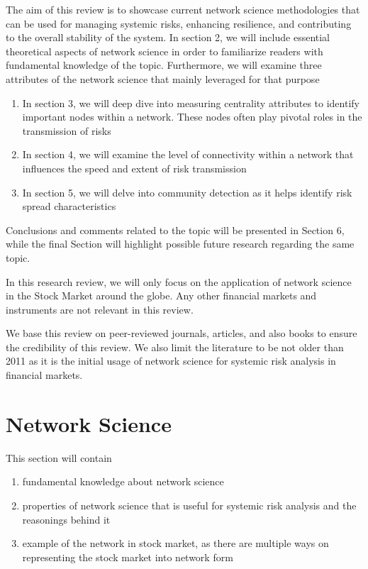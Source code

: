 \documentclass[a4paper,11pt]{article}
\begin{document}
The aim of this review is to showcase current network science methodologies that can be used for managing systemic risks, enhancing resilience, and contributing to the overall stability of the system. In section 2, we will include essential theoretical aspects of network science in order to familiarize readers with fundamental knowledge of the topic. Furthermore, we will examine three attributes of the network science that mainly leveraged for that purpose

\begin{enumerate}
        \item In section 3, we will deep dive into measuring centrality attributes to identify important nodes within a network. These nodes often play pivotal roles in the transmission of risks
        \item In section 4, we will examine the level of connectivity within a network that influences the speed and extent of risk transmission
        \item In section 5, we will delve into community detection as it helps identify risk spread characteristics
\end{enumerate}
Conclusions and comments related to the topic will be presented in Section 6, while the final Section will highlight possible future research regarding the same topic.

In this research review, we will only focus on the application of network science in the Stock Market around the globe. Any other financial markets and instruments are not relevant in this review.

We base this review on peer-reviewed journals, articles, and also books to ensure the credibility of this review. We also limit the literature to be not older than 2011 as it is the initial usage of network science for systemic risk analysis in financial markets.


\section{Network Science}
This section will contain
\begin{enumerate}
    \item fundamental knowledge about network science
    \item properties of network science that is useful for systemic risk analysis and the reasonings behind it
    \item example of the network in stock market, as there are multiple ways on representing the stock market into network form
\end{enumerate}
\end{document}
